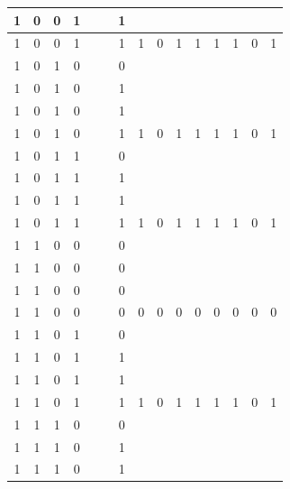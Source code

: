 \begin{table}[!tb]
\begin{tabular}{|c|c|c|c|c|c|c|c|c|c|c|c|c|c|c|}
        \rowcolor{yellow!40} 1 & 0 & 0 & 1 &  &  & 1 &  &  &  &  &  &  &  &  \\ \hline
        \rowcolor{yellow!40} 1 & 0 & 0 & 1 &  &  & 1 & 1 & 0 & 1 & 1 & 1 & 1 & 0 & 1 \\ \hline
        \rowcolor{gray!40} 1 & 0 & 1 & 0 &  &  & 0 &  &  &  &  &  &  &  &  \\ \hline
        \rowcolor{gray!40} 1 & 0 & 1 & 0 &  &  & 1 &  &  &  &  &  &  &  &  \\ \hline
        \rowcolor{gray!40} 1 & 0 & 1 & 0 &  &  & 1 &  &  &  &  &  &  &  &  \\ \hline
        \rowcolor{gray!40} 1 & 0 & 1 & 0 &  &  & 1 & 1 & 0 & 1 & 1 & 1 & 1 & 0 & 1 \\ \hline
        \rowcolor{blue!40} 1 & 0 & 1 & 1 &  &  & 0 &  &  &  &  &  &  &  &  \\ \hline
        \rowcolor{blue!40} 1 & 0 & 1 & 1 &  &  & 1 &  &  &  &  &  &  &  &  \\ \hline
        \rowcolor{blue!40} 1 & 0 & 1 & 1 &  &  & 1 &  &  &  &  &  &  &  &  \\ \hline
        \rowcolor{blue!40} 1 & 0 & 1 & 1 &  &  & 1 & 1 & 0 & 1 & 1 & 1 & 1 & 0 & 1 \\ \hline
        \rowcolor{red!40} 1 & 1 & 0 & 0 &  &  & 0 &  &  &  &  &  &  &  &  \\ \hline
        \rowcolor{red!40} 1 & 1 & 0 & 0 &  &  & 0 &  &  &  &  &  &  &  &  \\ \hline
        \rowcolor{red!40} 1 & 1 & 0 & 0 &  &  & 0 &  &  &  &  &  &  &  &  \\ \hline
        \rowcolor{red!40} 1 & 1 & 0 & 0 &  &  & 0 & 0 & 0 & 0 & 0 & 0 & 0 & 0 & 0 \\ \hline
        \rowcolor{green!40} 1 & 1 & 0 & 1 &  &  & 0 &  &  &  &  &  &  &  &  \\ \hline
        \rowcolor{green!40} 1 & 1 & 0 & 1 &  &  & 1 &  &  &  &  &  &  &  &  \\ \hline
        \rowcolor{green!40} 1 & 1 & 0 & 1 &  &  & 1 &  &  &  &  &  &  &  &  \\ \hline
        \rowcolor{green!40} 1 & 1 & 0 & 1 &  &  & 1 & 1 & 0 & 1 & 1 & 1 & 1 & 0 & 1 \\ \hline
        \rowcolor{yellow!40} 1 & 1 & 1 & 0 &  &  & 0 &  &  &  &  &  &  &  &  \\ \hline
        \rowcolor{yellow!40} 1 & 1 & 1 & 0 &  &  & 1 &  &  &  &  &  &  &  &  \\ \hline
        \rowcolor{yellow!40} 1 & 1 & 1 & 0 &  &  & 1 &  &  &  &  &  &  &  &  \\ \hline

\end{tabular}
\end{table}
